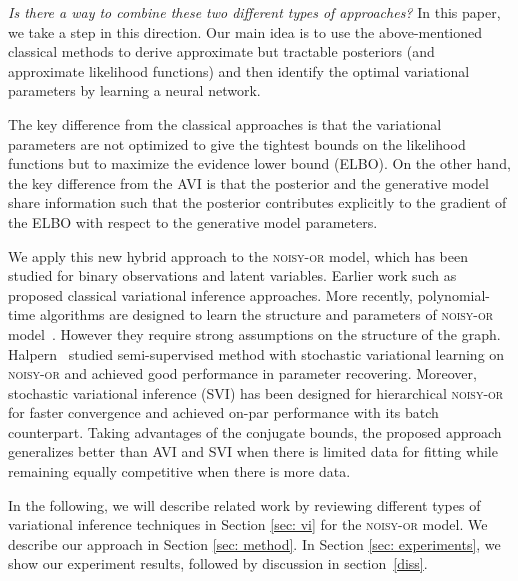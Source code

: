 \emph{Is there a way to combine these two different types of approaches?} In this paper, we take a step in this direction. Our main idea is to use the above-mentioned classical methods to derive approximate but tractable posteriors (and approximate likelihood functions) and then identify the optimal variational parameters by learning a neural network. 

The key difference from the classical approaches is that the variational parameters are not optimized to give the tightest bounds on the likelihood functions but to maximize the evidence lower bound (ELBO). On the other hand, the key difference from the AVI is that the posterior and the generative model share information such that the posterior contributes explicitly to the gradient of  the ELBO with respect to the generative  model parameters.

We apply this new hybrid approach to the  \textsc{noisy-or} model, which has been studied for binary observations and latent variables. Earlier work such as \citep{jaakkola1999variational, vsingliar2006noisy} proposed classical variational inference approaches. More recently, polynomial-time algorithms are designed to learn the structure and parameters of \textsc{noisy-or} model~\citep{halpern2013unsupervised, jernite2013discovering}.
However they require strong assumptions on the structure of the graph. Halpern~\citep{halpern2016semi} studied semi-supervised method with stochastic variational learning on \textsc{noisy-or} and achieved good performance in parameter recovering. 
Moreover, stochastic variational inference (SVI) has been designed for hierarchical \textsc{noisy-or}~\citep{jivariational} for faster convergence and achieved on-par performance with its batch counterpart.
Taking advantages of the conjugate bounds, the proposed approach generalizes better than AVI and SVI when there is  limited data for fitting while remaining equally competitive when there is more data. 

In the following, we will describe related work by reviewing different types of variational inference techniques in Section \ref{sec: vi} for the  \textsc{noisy-or} model. We describe our approach in Section \ref{sec: method}. In Section \ref{sec: experiments}, we show our experiment results, followed by discussion in section~\ref{diss}.




